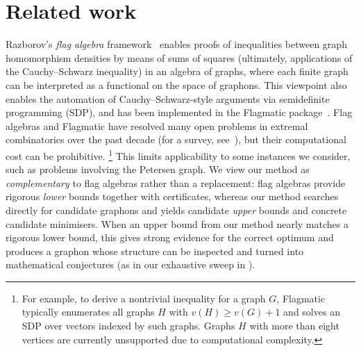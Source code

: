 \documentclass{article}
\theoremstyle{plain}
\theoremstyle{definition}
\theoremstyle{remark}
\begin{document}



\appendix

\newpage

\allowdisplaybreaks[0]

\section{Related work}

Razborov's \emph{flag algebra} framework~\citep{razborov2007flag} enables proofs of inequalities between graph homomorphism densities by means of sums of squares (ultimately, applications of the Cauchy--Schwarz inequality) in an algebra of graphs, where each finite graph can be interpreted as a functional on the space of graphons. This viewpoint also enables the automation of Cauchy--Schwarz-style arguments via semidefinite programming (SDP), and has been implemented in the {\sc Flagmatic} package~\citep{falgas2013applications}.
Flag algebras and Flagmatic have resolved many open problems in extremal combinatorics over the past decade (for a survey, see~\citet{razborov2013flag}), but their computational cost can be prohibitive. \footnote{For example, to derive a nontrivial inequality for a graph $G$, {\sc Flagmatic} typically enumerates all graphs $H$ with $v(H) \geq v(G)+1$ and solves an SDP over vectors indexed by such graphs. Graphs $H$ with more than eight vertices are currently unsupported due to computational complexity.}
This limits applicability to some instances we consider, such as problems involving the Petersen graph.
We view our method as \emph{complementary} to flag algebras rather than a replacement: flag algebras provide rigorous \emph{lower} bounds together with certificates, whereas our method searches directly for candidate graphons and yields candidate \emph{upper} bounds and concrete candidate minimisers. When an upper bound from our method nearly matches a rigorous lower bound, this gives strong evidence for the correct optimum and produces a graphon whose structure can be inspected and turned into mathematical conjectures (as in our exhaustive sweep in ).
\end{document}
